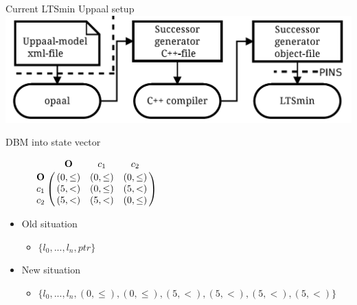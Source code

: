 \begin{frame}{Current LTSmin Uppaal setup}
\includegraphics[width=\textwidth]{img/opaal}
\end{frame}

\begin{frame}{DBM into state vector}
\begin{figure}
	\centering
	\begin{math}
 \bordermatrix{ 		                 & \mathbf{O} & c_1           & c_2        \cr
 			\mathbf{O} &(0,\leq)      & (0,\leq)      & (0,\leq)     \cr
 			c_1        &(5,<)      & (0,\leq)      & (5,<)\cr
 			c_2        &(5,<)      & (5,<) & (0,\leq)     \cr}
	\end{math}
\end{figure}


\begin{itemize}
	\item Old situation
	\begin{itemize}
		\item $\{l_0,...,l_n,ptr\}$
	\end{itemize}
	\item New situation
	\begin{itemize}
		\item $\{l_0,...,l_n,(0,\leq),(0,\leq),(5,<),(5,<),(5,<),(5,<)\}$
	\end{itemize}
\end{itemize}
\end{frame}


